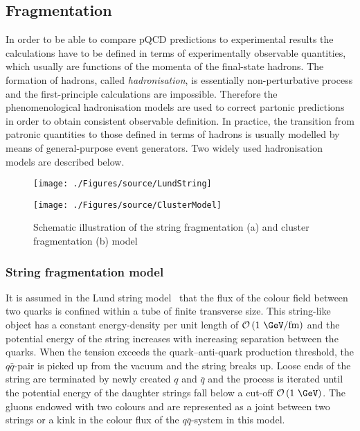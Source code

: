 \subsection{Fragmentation}
\label{subsec:fragmentation}
In order to be able to compare pQCD predictions to experimental results the calculations have to be defined in terms of experimentally observable quantities, which usually are functions of the momenta of the final-state hadrons. The formation of hadrons, called \emph{hadronisation}, is essentially non-perturbative process and the first-principle calculations are impossible. Therefore the phenomenological hadronisation models are used to correct partonic predictions in order to obtain consistent observable definition. In practice, the transition from patronic quantities to those defined in terms of hadrons is usually modelled by means of general-purpose event generators. Two widely used hadronisation models are described below.
\begin{figure}[t]
	\centering
	\begin{subfloat}[]{
		\texttt{[image: ./Figures/source/LundString]}
		\label{fig:lund}
	 }%
	\end{subfloat}
	\begin{subfloat}[]{
		\texttt{[image: ./Figures/source/ClusterModel]}
		\label{fig:cluster}
	}%
	\end{subfloat}
	\caption{Schematic illustration of the string fragmentation (a) and cluster fragmentation (b) model}
\label{fig:fragmentationmodels}
\end{figure}
\subsubsection{String fragmentation model}
It is assumed in the Lund string model~\cite{Andersson:1983ia} that the flux of the colour field between two quarks is confined within a tube of finite transverse size. This string-like object has a constant energy-density per unit length of $\mathcal{O}\left( \text{1 \GeV/fm}\right)$ and the potential energy of the string increases with increasing separation between the quarks. When the tension exceeds the quark--anti-quark production threshold, the $q\bar{q}$-pair is picked up from the vacuum and the string breaks up. Loose ends of the string are terminated by newly created $q$ and $\bar{q}$ and the process is iterated until the potential energy of the daughter strings fall below a cut-off $\mathcal{O}\left( \text{1 \GeV}\right)$. The gluons endowed with two colours and are represented as a joint between two strings or a kink in the colour flux of the $q\bar{q}$-system in this model. 

